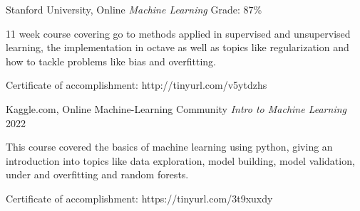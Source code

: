 

\begin{cventries}

\cventry
  {Stanford University, Online} %
  {\textit{Machine Learning}}
  {Grade: 87\%} %
  {} %
  {
    \begin{cvitems} %
      \item {11 week course covering go to methods applied in supervised and unsupervised learning, the implementation in octave as well as topics like regularization and how to tackle problems like bias and overfitting.}
      \item {Certificate of accomplishment: http://tinyurl.com/v5ytdzhs}
    \end{cvitems}
  }
  \newline
\cventry
  {Kaggle.com, Online Machine-Learning Community} %
  {\textit{Intro to Machine Learning}}
  {} %
  {2022} %
  {
    \begin{cvitems} %
      \item {This course covered the basics of machine learning using python, giving an introduction into topics like data exploration, model building, model validation, under and overfitting and random forests.}
      \item {Certificate of accomplishment: https://tinyurl.com/3t9xuxdy}
    \end{cvitems}
  }
  \newline


\end{cventries}
